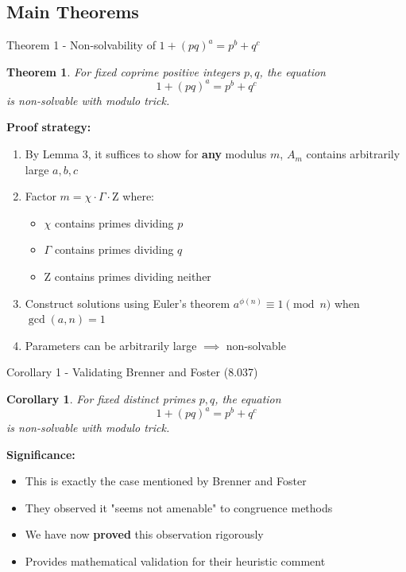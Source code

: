 ﻿\documentclass[10pt,aspectratio=169]{beamer}
\newtheorem{theorems}{Theorem}
\newtheorem{corollarys}{Corollary}
\begin{document}
\subsection{Main Theorems}

\begin{frame}{Theorem 1 - Non-solvability of $1+(pq)^a = p^b + q^c$}
    \begin{theorems}
        For fixed coprime positive integers $p,q$, the equation
        \[1+(pq)^a = p^b + q^c\]
        is non-solvable with modulo trick.
    \end{theorems}

    \textbf{Proof strategy:}
    \begin{enumerate}
        \item By Lemma 3, it suffices to show for \textbf{any} modulus $m$, $A_m$ contains arbitrarily large $a,b,c$
        \item Factor $m = \chi \cdot \Gamma \cdot \mathrm{Z}$ where:
            \begin{itemize}
                \item $\chi$ contains primes dividing $p$
                \item $\Gamma$ contains primes dividing $q$
                \item $\mathrm{Z}$ contains primes dividing neither
            \end{itemize}
        \item Construct solutions using Euler's theorem $a^{\phi(n)} \equiv 1 \pmod n$ when $\gcd(a,n)=1$
        \item Parameters can be arbitrarily large $\implies$ non-solvable
    \end{enumerate}
\end{frame}

\begin{frame}{Corollary 1 - Validating Brenner and Foster (8.037)}
    \begin{corollarys}
        For fixed distinct primes $p,q$, the equation
        \[1+(pq)^a = p^b + q^c\]
        is non-solvable with modulo trick.
    \end{corollarys}
    
    \vspace{0.3cm}
    \textbf{Significance:}
    \begin{itemize}
        \item This is exactly the case mentioned by Brenner and Foster
        \item They observed it "seems not amenable" to congruence methods
        \item We have now \textbf{proved} this observation rigorously
        \item Provides mathematical validation for their heuristic comment
    \end{itemize}
\end{frame}
\end{document}
